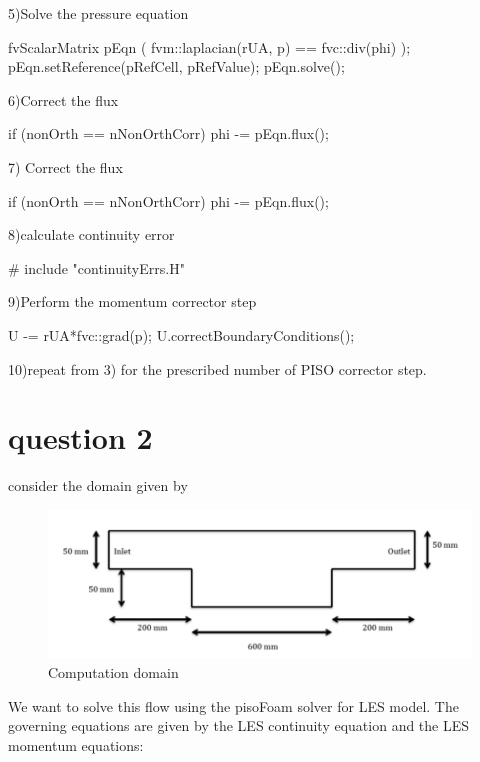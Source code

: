 \documentclass[10pt,a4paper]{report}
\begin{document}
5)Solve the pressure equation

\begin{code}
fvScalarMatrix pEqn
 (
    fvm::laplacian(rUA, p) == fvc::div(phi)
 );
 pEqn.setReference(pRefCell, pRefValue);
 pEqn.solve();
\end{code}

6)Correct the flux

\begin{code}
if (nonOrth == nNonOrthCorr)
 {
    phi -= pEqn.flux();
 }
\end{code}

7) Correct the flux
\begin{code}

 if (nonOrth == nNonOrthCorr)
 {
    phi -= pEqn.flux();
 }
\end{code}

8)calculate continuity error
\begin{code}
# include "continuityErrs.H"
\end{code}

9)Perform the momentum corrector step
\begin{code}
U -= rUA*fvc::grad(p);
 U.correctBoundaryConditions();
\end{code}

10)repeat from 3) for the prescribed number of PISO corrector step.\\


\section{question 2}
consider the domain given by 

\begin{figure}[H]
  \caption{Computation domain} 
  \centering
    \includegraphics[width=1\textwidth]{domain.png}
\end{figure}

We want to solve this flow using the pisoFoam solver for LES model. The governing equations are given by the LES continuity equation and the LES momentum equations:
\end{document}
